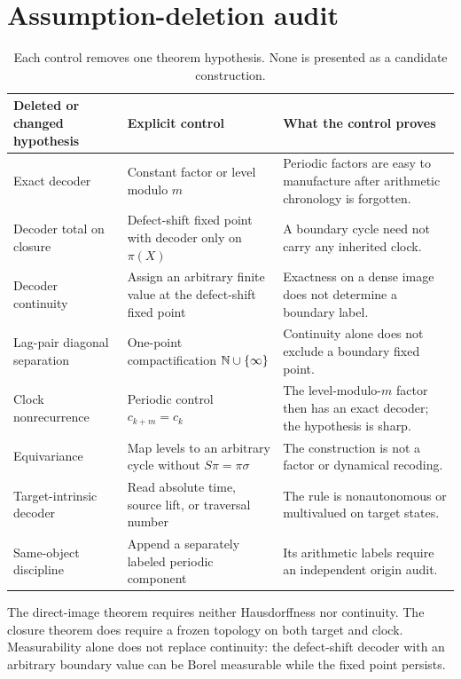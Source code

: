 \section{Assumption-deletion audit}
\label{app:audit}

\begin{table}[h]
\centering
\small
\begin{tabularx}{\textwidth}{@{}L{0.24\textwidth}>{\raggedright\arraybackslash}X>{\raggedright\arraybackslash}X@{}}
\toprule
Deleted or changed hypothesis & Explicit control & What the control proves \\
\midrule
Exact decoder
& Constant factor or level modulo $m$
& Periodic factors are easy to manufacture after arithmetic chronology is forgotten. \\
Decoder total on closure
& Defect-shift fixed point with decoder only on $\pi(X)$
& A boundary cycle need not carry any inherited clock. \\
Decoder continuity
& Assign an arbitrary finite value at the defect-shift fixed point
& Exactness on a dense image does not determine a boundary label. \\
Lag-pair diagonal separation
& One-point compactification $\mathbb{N}\cup\{\infty\}$
& Continuity alone does not exclude a boundary fixed point. \\
Clock nonrecurrence
& Periodic control $c_{k+m}=c_k$
& The level-modulo-$m$ factor then has an exact decoder; the hypothesis is sharp. \\
Equivariance
& Map levels to an arbitrary cycle without $S\pi=\pi\sigma$
& The construction is not a factor or dynamical recoding. \\
Target-intrinsic decoder
& Read absolute time, source lift, or traversal number
& The rule is nonautonomous or multivalued on target states. \\
Same-object discipline
& Append a separately labeled periodic component
& Its arithmetic labels require an independent origin audit. \\
\bottomrule
\end{tabularx}
\caption{Each control removes one theorem hypothesis.  None is presented as
a candidate construction.}
\label{tab:controls}
\end{table}

The direct-image theorem requires neither Hausdorffness nor continuity.  The
closure theorem does require a frozen topology on both target and clock.
Measurability alone does not replace continuity: the defect-shift decoder
with an arbitrary boundary value can be Borel measurable while the fixed
point persists.
